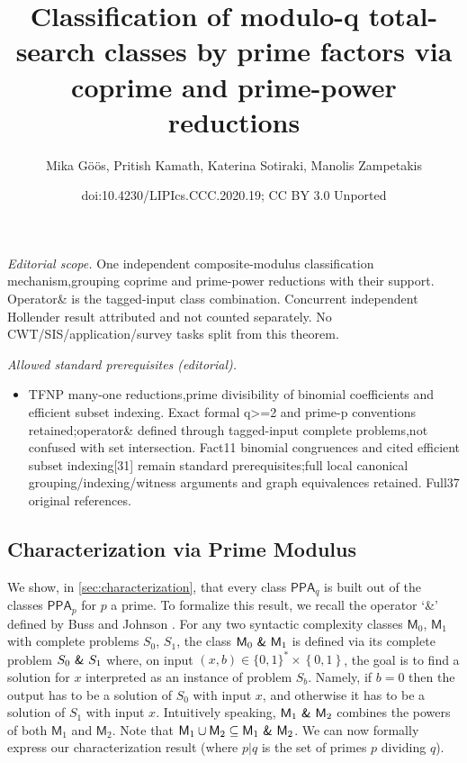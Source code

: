 \documentclass[10pt,a4paper]{article}
\title{Classification of modulo-q total-search classes by prime factors via coprime and prime-power reductions}
\author{Mika Göös, Pritish Kamath, Katerina Sotiraki, Manolis Zampetakis}
\date{doi:10.4230/LIPIcs.CCC.2020.19; CC BY 3.0 Unported}
\theoremstyle{definition}
\theoremstyle{remark}
\def\set#1{\left\{#1\right\}}
\newcommand{\bit}{\ensuremath{\set{0,1}}}
\newcommand{\class}[1]{\ensuremath{\mathsf{#1}}\xspace}
\newcommand{\PPA}{\class{PPA}}
\newcommand{\M}{\mathsf M}
\newcommand{\amp}{\textsf{\upshape\&}}
\newcommand{\bamp}{~\textsf{\upshape\&}~}
\begin{document}
\maketitle
\noindent\textit{Editorial scope.} One independent composite-modulus classification mechanism,grouping coprime and prime-power reductions with their support. Operator\& is the tagged-input class combination. Concurrent independent Hollender result attributed and not counted separately. No CWT/SIS/application/survey tasks split from this theorem.\par\medskip
\noindent\textit{Allowed standard prerequisites (editorial).}\begin{itemize}
\item TFNP many-one reductions,prime divisibility of binomial coefficients and efficient subset indexing. Exact formal q>=2 and prime-p conventions retained;operator\& defined through tagged-input complete problems,not confused with set intersection. Fact11 binomial congruences and cited efficient subset indexing[31] remain standard prerequisites;full local canonical grouping/indexing/witness arguments and graph equivalences retained. Full37 original references.
\end{itemize}\medskip
\setcounter{section}{1}
\setcounter{subsection}{0}
\setcounter{theorem}{0}
\setcounter{figure}{1}
\subsection{Characterization via Prime Modulus} \label{sec:intro-char}

  We show, in \autoref{sec:characterization}, that every class $\PPA_q$ is built
out of the classes $\PPA_p$ for $p$ a prime. To formalize this result, we
recall the operator `\amp' defined by Buss and
Johnson \cite[\S6]{r13}. For any two syntactic complexity
classes $\M_0$, $\M_1$ with complete problems $S_0$, $S_1$, the class
$\M_0 \bamp \M_1$ is defined via its complete problem $S_0 \bamp S_1$ where, on
input $(x, b) \in \{0, 1\}^* \times \bit$, the goal is to find a solution for
$x$ interpreted as an instance of problem $S_b$. Namely, if $b = 0$ then the output has to be a solution of $S_0$ with
input $x$, and otherwise it has to be a solution of $S_1$ with input $x$.
Intuitively speaking, $\M_1 \bamp \M_2$ combines
the powers of both $\M_1$ and $\M_2$. Note that
$\M_1 \cup \M_2 \subseteq \M_1 \bamp \M_2$. We can now formally
express our characterization result (where $p|q$ is the set of primes $p$
dividing $q$).
\end{document}
